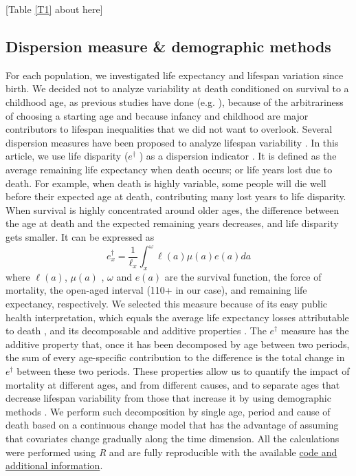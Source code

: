 \documentclass{article}
\begin{document}
\begin{spacing}{1.5}
\begin{center}
[Table \ref{T1} about here]
\end{center}



\subsection*{Dispersion measure \& demographic methods}

For each population, we investigated life expectancy and lifespan variation since birth. We decided not to analyze variability at death conditioned on survival to a childhood age, as previous studies have done (e.g. \citet{edwards2005, smits2009}), because of the arbitrariness of choosing a starting age and because infancy and childhood are major contributors to lifespan inequalities that we did not want to overlook. 
Several dispersion measures have been proposed to analyze lifespan variability \citep{vanraalte2013, wilmoth1999}. In this article, we use life disparity ($e^{\dagger}$ ) as a dispersion indicator \citep{vaupel&Canudas2003}. It is defined as the average remaining life expectancy when death occurs; or life years lost due to death.  For example, when death is highly variable, some people will die well before their expected age at death, contributing many lost years to life disparity. When survival is highly concentrated around older ages, the difference between the age at death and the expected remaining years decreases, and life disparity gets smaller.  It can be expressed as
\begin{equation}
\label{eq.edagger}
e_x^{\dagger}=\frac{1}{\ell_x}\int_x^\omega \ell(a) \mu(a)e(a)da
\end{equation}
where $\ell(a)$, $\mu(a)$ , $\omega$ and $e(a)$ are the survival function, the force of mortality, the open-aged interval (110+ in our case), and remaining life expectancy, respectively. 
We selected this measure because of its easy public health interpretation, which equals the average life expectancy losses attributable to death \citep{shkolnikov2011}, and its decomposable and additive properties \citep{zhang2009}. The $e^\dagger$ measure has the additive property that, once it has been decomposed by age between two periods, the sum of every age-specific contribution to the difference is the total change in $e^\dagger$ between these two periods. These properties allow us to quantify the impact of mortality at different ages, and from different causes, and to separate ages that decrease lifespan variability from those that increase it by using demographic methods \citep{zhang2009, shkolnikov2011}. We perform such decomposition by single age, period and cause of death based on a continuous change model \citep{horiuchi2008} that has the advantage of assuming that covariates change gradually along the time dimension. All the calculations were performed using \textit{R} \citep{team2000r} and are fully reproducible with the available \href{https://goo.gl/YhEgix}{code and additional information}.


\end{spacing}
\end{document}
